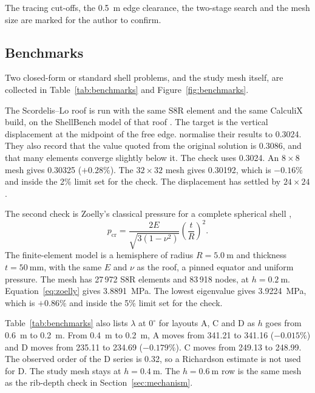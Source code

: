 \documentclass[11pt,a4paper]{article}
\begin{document}
The tracing cut-offs, the 0.5~m edge clearance, the two-stage search and the mesh size are marked for the author to confirm.

\subsection{Benchmarks}

Two closed-form or standard shell problems, and the study mesh itself, are collected in Table~\ref{tab:benchmarks} and Figure~\ref{fig:benchmarks}.

The Scordelis--Lo roof is run with the same S8R element and the same CalculiX build, on the ShellBench model of that roof \citep{scordelis1964}.
The target is the vertical displacement at the midpoint of the free edge.
\cite{macneal1985} normalise their results to 0.3024.
They also record that the value quoted from the original solution is 0.3086, and that many elements converge slightly below it.
The check uses 0.3024.
An \(8\times 8\) mesh gives 0.30325 (\(+0.28\%\)).
The \(32\times 32\) mesh gives 0.30192, which is \(-0.16\%\) and inside the 2\% limit set for the check.
The displacement has settled by \(24\times 24\).

The second check is Zoelly's classical pressure for a complete spherical shell \citep{zoelly1915},
\begin{equation}
p_{\mathrm{cr}}
  = \frac{2E}{\sqrt{3(1-\nu^{2})}}
    \left(\frac{t}{R}\right)^{2}.
\label{eq:zoelly}
\end{equation}
The finite-element model is a hemisphere of radius \(R = 5.0~\mathrm{m}\) and thickness \(t = 50~\mathrm{mm}\), with the same \(E\) and \(\nu\) as the roof, a pinned equator and uniform pressure.
The mesh has 27\,972 S8R elements and 83\,918 nodes, at \(h = 0.2~\mathrm{m}\).
Equation~\eqref{eq:zoelly} gives 3.8891~MPa.
The lowest eigenvalue gives 3.9224~MPa, which is \(+0.86\%\) and inside the 5\% limit set for the check.

Table~\ref{tab:benchmarks} also lists \(\lambda\) at \(0^{\circ}\) for layouts A, C and D as \(h\) goes from 0.6~m to 0.2~m.
From 0.4~m to 0.2~m, A moves from 341.21 to 341.16 (\(-0.015\%\)) and D moves from 235.11 to 234.69 (\(-0.179\%\)).
C moves from 249.13 to 248.99.
The observed order of the D series is 0.32, so a Richardson estimate is not used for D.
The study mesh stays at \(h = 0.4~\mathrm{m}\).
The \(h = 0.6~\mathrm{m}\) row is the same mesh as the rib-depth check in Section~\ref{sec:mechanism}.
\end{document}

